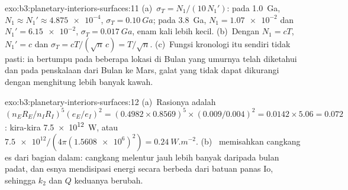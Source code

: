 \begin{solution}{exo:b3:planetary-interiors-surfaces:11}
(a)~$\sigma_T = N_1/(10\,N_1')$: pada \qty{1.0}{Ga}, $N_1 \approx N_1' \approx
\num{4.875e-4}$, $\sigma_T = \qty{0.10}{Ga}$; pada \qty{3.8}{Ga}, $N_1 =
\num{1.07e-2}$ dan $N_1' = \num{6.15e-2}$, $\sigma_T = \qty{0.017}{Ga}$,
enam kali lebih kecil. (b)~Dengan $N_1 = cT$, $N_1' = c$ dan $\sigma_T =
cT/(\sqrt n\,c) = T/\sqrt n$. (c)~Fungsi kronologi itu sendiri
tidak pasti: ia bertumpu pada beberapa lokasi di Bulan yang umurnya telah diketahui dan pada
penskalaan dari Bulan ke Mars, galat yang tidak dapat dikurangi dengan menghitung lebih banyak kawah.
\end{solution}

\begin{solution}{exo:b3:planetary-interiors-surfaces:12}
(a)~Rasionya adalah $(n_ER_E/n_IR_I)^5(e_E/e_I)^2 = (0.4982\times0.8569)^5
\times(0.009/0.004)^2 = 0.0142\times5.06 = 0.072$: kira-kira
\qty{7.5e12}{W}, atau $\num{7.5e12}/(4\pi(\num{1.5608e6})^2) =
\qty{0.24}{W.m^{-2}}$. (b)~ memisahkan cangkang es dari
bagian dalam: cangkang melentur jauh lebih banyak daripada bulan padat, dan esnya
mendisipasi energi secara berbeda dari batuan panas Io, sehingga $k_2$ dan $Q$ keduanya berubah.
\end{solution}


